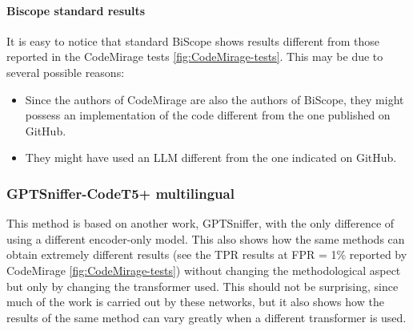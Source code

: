 \paragraph{Biscope standard results}
It is easy to notice that standard BiScope shows results different 
from those reported in the CodeMirage tests \ref{fig:CodeMirage-tests}. 
This may be due to several possible reasons:
\begin{itemize}
\item Since the authors of CodeMirage are also the authors of BiScope, 
they might possess an implementation of the code different from the one 
published on GitHub.
\item They might have used an LLM different from the one indicated on GitHub.
\end{itemize}

\clearpage
\subsubsection{GPTSniffer-CodeT5+ multilingual}
This method is based on another work, GPTSniffer\cite{nguyen2024gptsniffer}, 
with the only difference 
of using a different encoder-only model. This also shows how the same methods 
can obtain extremely different results (see the TPR results at FPR = 1\% 
reported by CodeMirage \ref{fig:CodeMirage-tests}) 
without changing the methodological aspect but only by 
changing the transformer used. This should not be surprising, since much of the 
work is carried out by these networks, but it also shows how the results of the 
same method can vary greatly when a different transformer is used.

